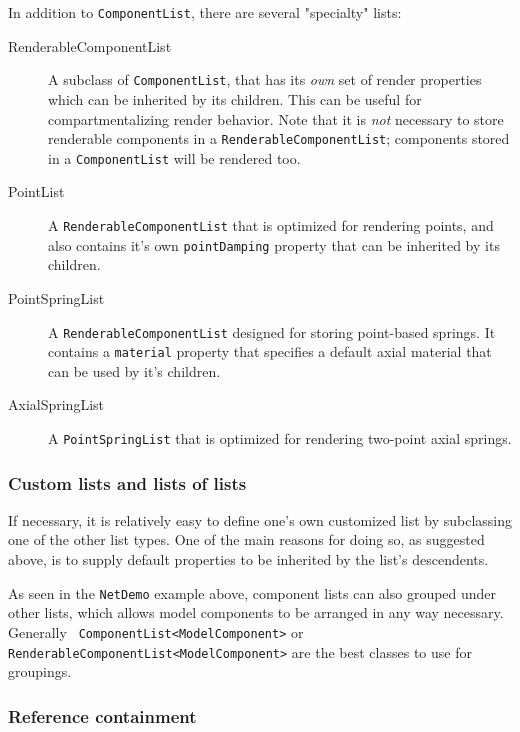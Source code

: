 \documentclass{article}
\begin{document}
In addition to {\tt ComponentList}, there are several "specialty"
lists:

\begin{description}

\item[RenderableComponentList] A subclass of {\tt ComponentList}, that
has its {\it own} set of render properties which can be inherited by
its children. This can be useful for compartmentalizing render
behavior.  Note that it is {\it not} necessary to store renderable
components in a {\tt RenderableComponentList}; components stored in a
{\tt ComponentList} will be rendered too.

\item[PointList] A {\tt RenderableComponentList} that is optimized for
rendering points, and also contains it's own {\tt pointDamping}
property that can be inherited by its children.

\item[PointSpringList] A {\tt RenderableComponentList} designed for
storing point-based springs. It contains a {\tt material} property that
specifies a default axial material that can be used by it's children.

\item[AxialSpringList] A {\tt PointSpringList} that is optimized for
rendering two-point axial springs.

\end{description}

\subsubsection*{Custom lists and lists of lists}

If necessary, it is relatively easy to define one's own customized
list by subclassing one of the other list types. One of the main
reasons for doing so, as suggested above, is to supply default
properties to be inherited by the list's descendents.

As seen in the {\tt NetDemo} example above, component lists can also
grouped under other lists, which allows model components to be
arranged in any way necessary.  Generally {\tt
ComponentList<ModelComponent>} or {\tt
RenderableComponentList<ModelComponent>} are the best classes to use
for groupings.

\subsubsection*{Reference containment}
\end{document}
